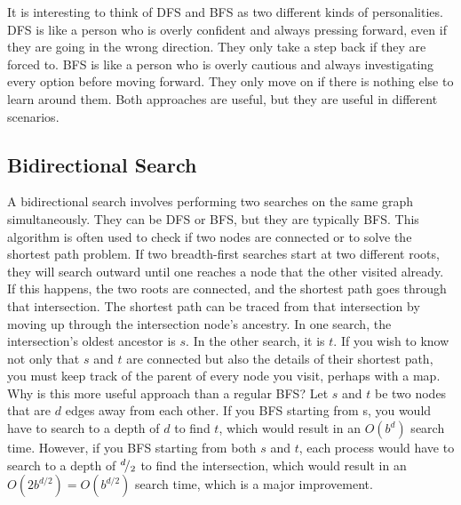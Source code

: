\begin{tcolorbox}[enhanced, colback=textbook-blue, sharp corners]
	It is interesting to think of DFS and BFS as two different kinds of personalities. DFS is like a person who is overly confident and always pressing forward, even if they are going in the wrong direction. They only take a step back if they are forced to. BFS is like a person who is overly cautious and always investigating every option before moving forward. They only move on if there is nothing else to learn around them. Both approaches are useful, but they are useful in different scenarios. \\
\end{tcolorbox}
\vspace{5mm}


\subsection{Bidirectional Search}

A bidirectional search involves performing two searches on the same graph simultaneously. They can be DFS or BFS, but they are typically BFS. This algorithm is often used to check if two nodes are connected or to solve the shortest path problem. If two breadth-first searches start at two different roots, they will search outward until one reaches a node that the other visited already. If this happens, the two roots are connected, and the shortest path goes through that intersection. The shortest path can be traced from that intersection by moving up through the intersection node's ancestry. In one search, the intersection's oldest ancestor is $s$. In the other search, it is $t$. If you wish to know not only that $s$ and $t$ are connected but also the details of their shortest path, you must keep track of the parent of every node you visit, perhaps with a map. \\

Why is this more useful approach than a regular BFS? Let $s$ and $t$ be two nodes that are $d$ edges away from each other. If you BFS starting from s, you would have to search to a depth of $d$ to find $t$, which would result in an $O(b^d)$ search time. However, if you BFS starting from both $s$ and $t$, each process would have to search to a depth of ${}^{d}\!/_{2}$ to find the intersection, which would result in an $O(2b^{d/2})=O(b^{d/2})$ search time, which is a major improvement. \\

